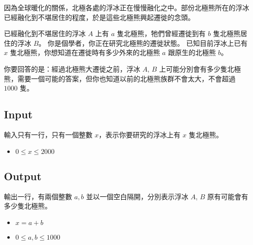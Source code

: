 
因為全球暖化的關係，北極各處的浮冰正在慢慢融化之中。部份北極熊所在的浮冰已經融化到不堪居住的程度，於是這些北極熊興起遷徙的念頭。

已經融化到不堪居住的浮冰 $A$ 上有 $a$ 隻北極熊，牠們曾經遷徙到有 $b$ 隻北極熊居住的浮冰 $B$。
你是個學者，你正在研究北極熊的遷徙狀態。
已知目前浮冰上已有 $x$ 隻北極熊，你想知道在遷徙時有多少外來的北極熊 $a$ 跟原生的北極熊 $b$。

你要回答的是：經過北極熊大遷徙之前，浮冰 $A$, $B$ 上可能分別會有多少隻北極熊，需要一個可能的答案，但你也知道以前的北極熊族群不會太大，不會超過 $1000$ 隻。

\subsection*{Input}

輸入只有一行，只有一個整數 $x$，表示你要研究的浮冰上有 $x$ 隻北極熊。

\begin{itemize}
    \item $0 \leq x \leq 2000$
\end{itemize}

\subsection*{Output}

輸出一行，有兩個整數 $a, b$ 並以一個空白隔開，分別表示浮冰 $A$, $B$ 原有可能會有多少隻北極熊。

\begin{itemize}
    \item $x = a + b$
    \item $0 \leq a, b \leq 1000$
\end{itemize}
